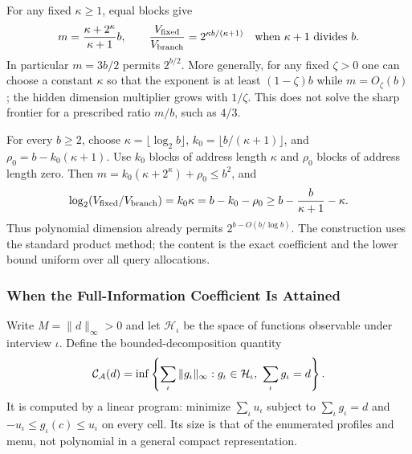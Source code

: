 For any fixed $\kappa\ge1$, equal blocks give
\[
 m=\frac{\kappa+2^\kappa}{\kappa+1}b,\qquad
 \frac{V_{\rm fixed}}{V_{\rm branch}}=2^{\kappa b/(\kappa+1)}
 \quad\text{when }\kappa+1\text{ divides }b.
\]
In particular $m=3b/2$ permits $2^{b/2}$. More generally, for any fixed $\zeta>0$ one can choose a constant $\kappa$ so that the exponent is at least $(1-\zeta)b$ while $m=O_\zeta(b)$; the hidden dimension multiplier grows with $1/\zeta$. This does not solve the sharp frontier for a prescribed ratio $m/b$, such as $4/3$.

For every $b\ge2$, choose $\kappa=\lfloor\log_2 b\rfloor$, $k_0=\lfloor b/(\kappa+1)\rfloor$, and $\rho_0=b-k_0(\kappa+1)$. Use $k_0$ blocks of address length $\kappa$ and $\rho_0$ blocks of address length zero. Then $m=k_0(\kappa+2^\kappa)+\rho_0\le b^2$, and
\[
 \log_2(V_{\rm fixed}/V_{\rm branch})
 =k_0\kappa=b-k_0-\rho_0
 \ge b-\frac{b}{\kappa+1}-\kappa.
\]
Thus polynomial dimension already permits $2^{b-O(b/\log b)}$. The construction uses the standard product method; the content is the exact coefficient and the lower bound uniform over all query allocations.

\subsubsection{When the Full-Information Coefficient Is Attained}\label{app:equality}
Write $M=\|d\|_\infty>0$ and let $\mathcal H_\iota$ be the space of functions observable under interview $\iota$. Define the bounded-decomposition quantity
\[
 \mathcal C_\mathcal A(d)=\inf\left\{\sum_\iota\|g_\iota\|_\infty:
       g_\iota\in\mathcal H_\iota,\ \sum_\iota g_\iota=d\right\}.
\]
It is computed by a linear program: minimize $\sum_\iota u_\iota$ subject to $\sum_\iota g_\iota=d$ and $-u_\iota\le g_\iota(c)\le u_\iota$ on every cell. Its size is that of the enumerated profiles and menu, not polynomial in a general compact representation.

